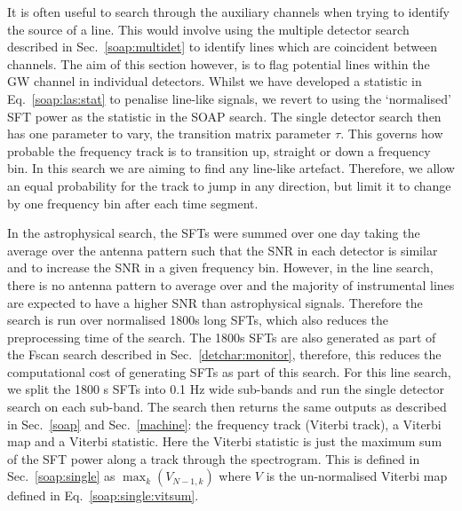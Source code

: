 It is often useful to search through the auxiliary channels when trying to
identify the source of a line. 
This would involve using the multiple detector search described in Sec.~\ref{soap:multidet} to identify lines which are coincident between channels. 
The aim of this section however, is to flag potential lines within the \gls{GW} channel in individual detectors.
Whilst we have developed a statistic in Eq.~\ref{soap:las:stat} to penalise
line-like signals, we revert to using the
`normalised' \gls{SFT} power as the statistic in the SOAP search. The single
detector search then has one parameter to vary, the transition matrix
parameter $\tau$.  This governs how probable the frequency track is to transition up,
straight or down a frequency bin.  In this search we are aiming to find any line-like artefact.
Therefore, we allow an equal probability for the track to jump in any
direction, but limit it to change by one frequency bin after each time
segment.  

In the astrophysical search, the \glspl{SFT} were summed over one day taking the average over the antenna pattern such that the \gls{SNR} in each detector is similar and to increase the \gls{SNR} in a given frequency bin.
However, in the line search, there is no antenna pattern to average over and the majority of instrumental lines are expected to have a higher \gls{SNR} than astrophysical signals.
Therefore the search is run over normalised 1800s long \glspl{SFT}, which also reduces the preprocessing time of the search.
The 1800s \glspl{SFT} are also generated as part of the Fscan search described in Sec.~\ref{detchar:monitor}, therefore, this reduces the computational cost of generating \glspl{SFT} as part of this search. 
For this line search, we split the 1800 s \glspl{SFT} into 0.1 Hz wide sub-bands and run the single detector search on each sub-band. 
The search then returns the same outputs as described in
Sec.~\ref{soap} and Sec.~\ref{machine}: the frequency track (Viterbi track), a
Viterbi map and a Viterbi statistic.  Here the Viterbi statistic is just the maximum
sum of the \gls{SFT} power along a track through the spectrogram.
This is defined in Sec.~\ref{soap:single} as $\max_k(V_{N-1,k})$ where $V$ is the un-normalised Viterbi map defined in Eq.~\ref{soap:single:vitsum}.

